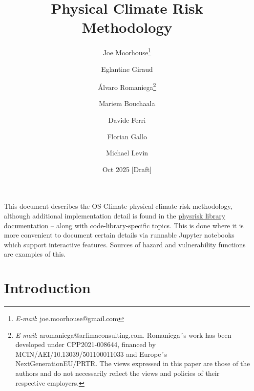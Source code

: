 \documentclass[a4paper,11pt]{extarticle} %
\title{Physical Climate Risk Methodology}
\author{Joe Moorhouse\thanks{\textit{E-mail}: joe.moorhouse@gmail.com}
        \and
        Eglantine Giraud
        \and
        Álvaro Romaniega\thanks{\textit{E-mail}: aromaniega@arfimaconsulting.com. Romaniega´s work has been developed under CPP2021-008644, financed by MCIN/AEI/10.13039/501100011033 and Europe´s NextGenerationEU/PRTR.
        \smallskip
        \newline%
    The views expressed in this paper are those of the authors and do not necessarily reflect the views and policies of their respective employers.}        
        \and
        Mariem Bouchaala
        \and
        Davide Ferri
        \and
        Florian Gallo
        \and
        Michael Levin
    }
\date{Oct 2025 [Draft]}
\theoremstyle{definition}
\begin{document}

\maketitle{}



\clearpage
\setcounter{tocdepth}{4}
\renewcommand{\contentsname}{Contents}
\tableofcontents




\clearpage

\begin{framed}
This document describes the OS-Climate physical climate risk methodology, although additional implementation detail is found in the \href{https://physrisk.readthedocs.io/en/latest/}{physrisk library documentation} -- along with code-library-specific topics. This is done where it is more convenient to document certain details via runnable Jupyter notebooks which support interactive features. Sources of hazard and vulnerability functions are examples of this.
\end{framed}

\section{Introduction}
\label{Sec:Introduction}
\end{document}
